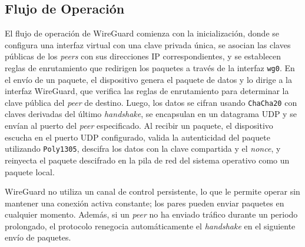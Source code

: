     \subsection{Flujo de Operación}  
    El flujo de operación de WireGuard comienza con la inicialización, donde se configura una interfaz virtual con una clave privada única, se asocian las claves públicas de los \textit{peers} con sus direcciones IP correspondientes, y se establecen reglas de enrutamiento que redirigen los paquetes a través de la interfaz \texttt{wg0}. En el envío de un paquete, el dispositivo genera el paquete de datos y lo dirige a la interfaz WireGuard, que verifica las reglas de enrutamiento para determinar la clave pública del \textit{peer} de destino. Luego, los datos se cifran usando \texttt{ChaCha20} con claves derivadas del último \textit{handshake}, se encapsulan en un datagrama UDP y se envían al puerto del \textit{peer} especificado. Al recibir un paquete, el dispositivo escucha en el puerto UDP configurado, valida la autenticidad del paquete utilizando \texttt{Poly1305}, descifra los datos con la clave compartida y el \textit{nonce}, y reinyecta el paquete descifrado en la pila de red del sistema operativo como un paquete local.
   
    WireGuard no utiliza un canal de control persistente, lo que le permite operar sin mantener una conexión activa constante; los pares pueden enviar paquetes en cualquier momento. Además, si un \textit{peer} no ha enviado tráfico durante un periodo prolongado, el protocolo renegocia automáticamente el \textit{handshake} en el siguiente envío de paquetes.
   
